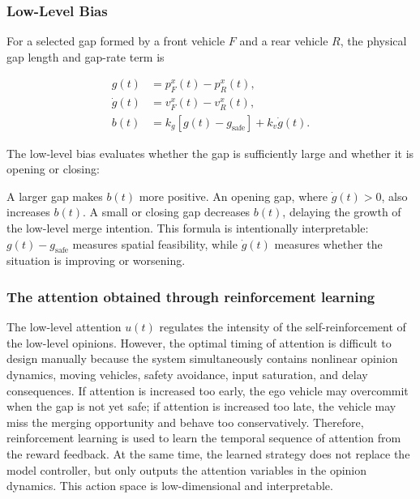 \subsubsection{Low-Level Bias}





For a selected gap formed by a front vehicle \(F\) and a rear vehicle \(R\), the physical gap length and  gap-rate term is



{\small
\begin{equation}
\begin{aligned}
g(t)&=p_F^x(t)-p_R^x(t),\\
\dot{g}(t)&=v_F^x(t)-v_R^x(t),\\
b(t)&=k_g\left[g(t)-g_{\mathrm{safe}}\right]+k_v\dot{g}(t).
\end{aligned}
\end{equation}
}







The low-level bias evaluates whether the gap is sufficiently large and whether it is opening or closing:





A larger gap makes \(b(t)\) more positive. An opening gap, where \(\dot{g}(t)>0\), also increases \(b(t)\). A small or closing gap decreases \(b(t)\), delaying the growth of the low-level merge intention. This formula is intentionally interpretable: \(g(t)-g_{\mathrm{safe}}\) measures spatial feasibility, while \(\dot{g}(t)\) measures whether the situation is improving or worsening.



\subsubsection{The attention obtained through reinforcement learning}





The low-level attention \(u(t)\) regulates the intensity of the self-reinforcement of the low-level opinions. However, the optimal timing of attention is difficult to design manually because the system simultaneously contains nonlinear opinion dynamics, moving vehicles, safety avoidance, input saturation, and delay consequences. If attention is increased too early, the ego vehicle may overcommit when the gap is not yet safe; if attention is increased too late, the vehicle may miss the merging opportunity and behave too conservatively. Therefore, reinforcement learning is used to learn the temporal sequence of attention from the reward feedback. At the same time, the learned strategy does not replace the model controller, but only outputs the attention variables in the opinion dynamics. This action space is low-dimensional and interpretable.




